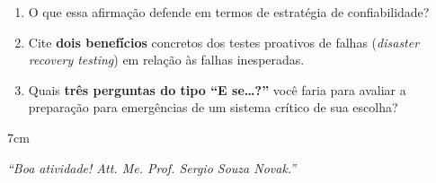 \documentclass[12pt]{article}
\begin{document}
\begin{enumerate}[label=\alph*)]
  \item O que essa afirmação defende em termos de estratégia de confiabilidade?
  \item Cite \textbf{dois benefícios} concretos dos testes proativos de falhas
        (\textit{disaster recovery testing}) em relação às falhas inesperadas.
  \item Quais \textbf{três perguntas do tipo ``E se\ldots?''} você faria para avaliar
        a preparação para emergências de um sistema crítico de sua escolha?
\end{enumerate}
\begin{resposta}{7cm}
\end{resposta}

\vspace{0.8cm}

\begin{center}
  \textit{``Boa atividade! Att. Me. Prof. Sergio Souza Novak.''}
\end{center}

\end{document}
